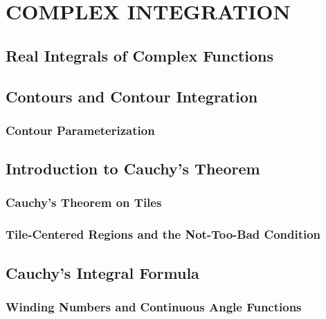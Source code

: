 \section{COMPLEX INTEGRATION}
\subsection{Real Integrals of Complex Functions}
\subsection{Contours and Contour Integration}
\subsubsection{Contour Parameterization}
\subsection{Introduction to Cauchy's Theorem}
\subsubsection{Cauchy's Theorem on Tiles}
\subsubsection{Tile-Centered Regions and the Not-Too-Bad Condition}
\subsection{Cauchy's
 Integral Formula}
\subsubsection{Winding Numbers and Continuous Angle Functions}

